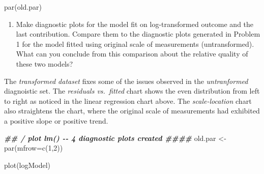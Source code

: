 \documentclass[
]{article}
\newenvironment{Shaded}{\begin{snugshade}}{\end{snugshade}}
\newcommand{\AttributeTok}[1]{\textcolor[rgb]{0.77,0.63,0.00}{#1}}
\newcommand{\DecValTok}[1]{\textcolor[rgb]{0.00,0.00,0.81}{#1}}
\newcommand{\DocumentationTok}[1]{\textcolor[rgb]{0.56,0.35,0.01}{\textbf{\textit{#1}}}}
\newcommand{\FunctionTok}[1]{\textcolor[rgb]{0.00,0.00,0.00}{#1}}
\newcommand{\NormalTok}[1]{#1}
\newcommand{\OtherTok}[1]{\textcolor[rgb]{0.56,0.35,0.01}{#1}}
\providecommand{\tightlist}{%
  \setlength{\itemsep}{0pt}\setlength{\parskip}{0pt}}
\begin{document}
\begin{Shaded}
\begin{Highlighting}[]
\FunctionTok{par}\NormalTok{(old.par)}
\end{Highlighting}
\end{Shaded}

\begin{enumerate}
\def\labelenumi{\arabic{enumi}.}
\setcounter{enumi}{2}
\tightlist
\item
  Make diagnostic plots for the model fit on log-transformed outcome and
  the last contribution. Compare them to the diagnostic plots generated
  in Problem 1 for the model fitted using original scale of measurements
  (untransformed). What can you conclude from this comparison about the
  relative quality of these two models?
\end{enumerate}

The \emph{transformed dataset} fixes some of the issues observed in the
\emph{untranformed} diagnoistic set. The \emph{residuals vs.~fitted}
chart shows the even distribution from left to right as noticed in the
linear regression chart above. The \emph{scale-location} chart also
straightens the chart, where the original scale of measurements had
exhibited a positive slope or positive trend.

\begin{Shaded}
\begin{Highlighting}[]
\DocumentationTok{\#\# / plot lm() {-}{-} 4 diagnostic plots created                                          \#\#\#\#}
\NormalTok{old.par }\OtherTok{\textless{}{-}} \FunctionTok{par}\NormalTok{(}\AttributeTok{mfrow=}\FunctionTok{c}\NormalTok{(}\DecValTok{1}\NormalTok{,}\DecValTok{2}\NormalTok{))}

\FunctionTok{plot}\NormalTok{(logModel)}
\end{Highlighting}
\end{Shaded}
\end{document}
